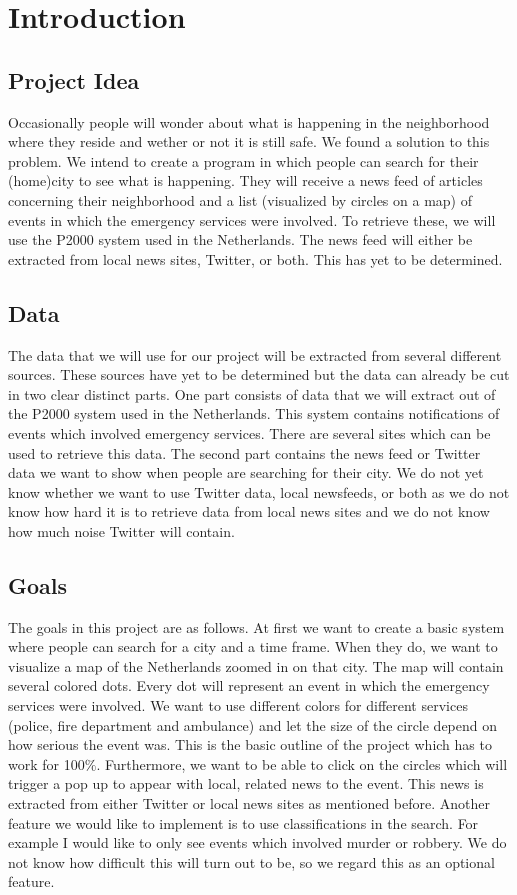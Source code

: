 \section{Introduction}
\subsection*{Project Idea}
Occasionally people will wonder about what is happening in the neighborhood where they reside and wether or not it is still safe.
We found a solution to this problem. We intend to create a program in which people can search for their (home)city to see what is happening. They will receive a news feed of articles concerning their neighborhood and a list (visualized by circles on a map) of events in which the emergency services were involved. To retrieve these, we will use the P2000 system used in the Netherlands. The news feed will either be extracted from local news sites, Twitter, or both. This has yet to be determined.

\subsection*{Data}
The data that we will use for our project will be extracted from several different sources. 
These sources have yet to be determined but the data can already be cut in two clear distinct parts. 
One part consists of data that we will extract out of the P2000 system used in the Netherlands. 
This system contains notifications of events which involved emergency services. 
There are several sites which can be used to retrieve this data.
The second part contains the news feed or Twitter data we want to show when people are searching for their city. 
We do not yet know whether we want to use Twitter data, local newsfeeds, or both as we do not know how hard it is to retrieve data from local news sites and we do not know how much noise Twitter will contain.
\subsection*{Goals}
The goals in this project are as follows. 
At first we want to create a basic system where people can search for a city and a time frame. 
When they do, we want to visualize a map of the Netherlands zoomed in on that city. 
The map will contain several colored dots. 
Every dot will represent an event in which the emergency services were involved. 
We want to use different colors for different services (police, fire department and ambulance) and let the size of the circle depend on how serious the event was. This is the basic outline of the project which has to work for 100$\%$. Furthermore, we want to be able to click on the circles which will trigger a pop up to appear with local, related news to the event. This news is extracted from either Twitter or local news sites as mentioned before. Another feature we would like to implement is to use classifications in the search. For example I would like to only see events which involved murder or robbery. We do not know how difficult this will turn out to be, so we regard this as an optional feature.
